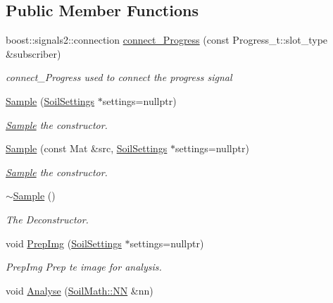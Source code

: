 \subsection*{Public Member Functions}
\begin{DoxyCompactItemize}
\item 
boost\+::signals2\+::connection \hyperlink{class_soil_analyzer_1_1_sample_a472dfdde346375463c979e45eb75fbb7}{connect\+\_\+\+Progress} (const Progress\+\_\+t\+::slot\+\_\+type \&subscriber)
\begin{DoxyCompactList}\small\item\em connect\+\_\+\+Progress used to connect the progress signal \end{DoxyCompactList}\item 
\hyperlink{class_soil_analyzer_1_1_sample_aa132beeb85f46a9d14f7ed0903eda595}{Sample} (\hyperlink{class_soil_analyzer_1_1_soil_settings}{Soil\+Settings} $\ast$settings=nullptr)
\begin{DoxyCompactList}\small\item\em \hyperlink{class_soil_analyzer_1_1_sample}{Sample} the constructor. \end{DoxyCompactList}\item 
\hyperlink{class_soil_analyzer_1_1_sample_a8d469b55b6af5c3e9283665df8430926}{Sample} (const Mat \&src, \hyperlink{class_soil_analyzer_1_1_soil_settings}{Soil\+Settings} $\ast$settings=nullptr)
\begin{DoxyCompactList}\small\item\em \hyperlink{class_soil_analyzer_1_1_sample}{Sample} the constructor. \end{DoxyCompactList}\item 
\hyperlink{class_soil_analyzer_1_1_sample_a26f964ba39721002cbb182f3834ebb3c}{$\sim$\+Sample} ()
\begin{DoxyCompactList}\small\item\em The Deconstructor. \end{DoxyCompactList}\item 
void \hyperlink{class_soil_analyzer_1_1_sample_a23050a1fff3e11e907657623756333b2}{Prep\+Img} (\hyperlink{class_soil_analyzer_1_1_soil_settings}{Soil\+Settings} $\ast$settings=nullptr)
\begin{DoxyCompactList}\small\item\em Prep\+Img Prep te image for analysis. \end{DoxyCompactList}\item 
void \hyperlink{class_soil_analyzer_1_1_sample_aeb62e34de081b3f298e9b8ebf82df36d}{Analyse} (\hyperlink{class_soil_math_1_1_n_n}{Soil\+Math\+::\+N\+N} \&nn)

\end{DoxyCompactItemize}
